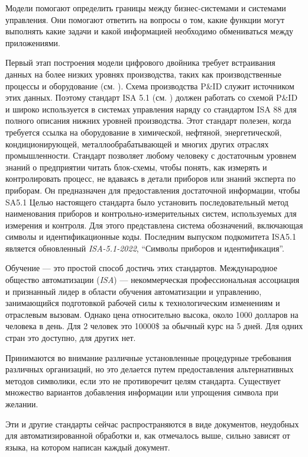 Модели помогают определить границы между бизнес-системами и системами управления. Они помогают ответить на вопросы о том, какие функции могут выполнять какие задачи и какой информацией необходимо обмениваться между приложениями.

Первый этап построения модели цифрового двойника требует встраивания данных на более низких уровнях производства, таких как производственные процессы и оборудование (см. ). Схема производства P\&ID служит источником этих данных. Поэтому стандарт ISA 5.1 (см. ) должен работать со схемой P\&ID и широко используется в системах управления наряду со стандартом ISA 88 для полного описания нижних уровней производства. Этот стандарт полезен, когда требуется ссылка на оборудование в химической, нефтяной, энергетической, кондиционирующей, металлообрабатывающей и многих других отраслях промышленности. Стандарт позволяет любому человеку с достаточным уровнем знаний о предприятии читать блок-схемы, чтобы понять, как измерять и контролировать процесс, не вдаваясь в детали приборов или знаний эксперта по приборам. Он предназначен для предоставления достаточной информации, чтобы SA5.1 Целью настоящего стандарта было установить последовательный метод наименования приборов и контрольно-измерительных систем, используемых для измерения и контроля. Для этого представлена система обозначений, включающая символы и идентификационные коды. Последним выпуском подкомитета ISA5.1 является обновленный \textit {ISA-5.1-2022}, ``Символы приборов и идентификация''.

Обучение — это простой способ достичь этих стандартов. Международное общество автоматизации (\textit {ISA}) — некоммерческая профессиональная ассоциация и признанный лидер в области обучения автоматизации и управлению, занимающийся подготовкой рабочей силы к технологическим изменениям и отраслевым вызовам. Однако цена относительно высока, около 1000 долларов на человека в день. Для 2 человек это 10000\$ за обычный курс на 5 дней. Для одних стран это доступно, для других нет.

Принимаются во внимание различные установленные процедурные требования различных организаций, но это делается путем предоставления альтернативных методов символики, если это не противоречит целям стандарта. Существует множество вариантов добавления информации или упрощения символа при желании.

Эти и другие стандарты сейчас распространяются в виде документов, неудобных для автоматизированной обработки и, как отмечалось выше, сильно зависят от языка, на котором написан каждый документ.


